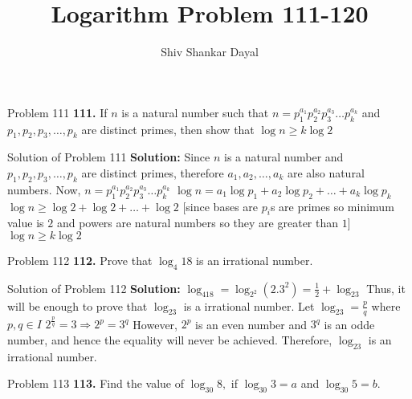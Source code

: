 \documentclass[aspectratio=169,8pt]{beamer}
\title{Logarithm Problem 111-120}
\author[Shiv Shankar Dayal]{Shiv Shankar Dayal}
\begin{document}
\begin{frame}
  \titlepage
\end{frame}
\begin{frame}{Problem 111}
  \textbf{111.} If $n$ is a natural number such that $n = p_1^{a_1}p_2^{a_2}p_3^{a_3}\ldots p_k^{a_k}$ and $p_1, p_2, p_3, \ldots, p_k$ are distinct primes, then show that $\log n\geq k\log 2$
\end{frame}
\begin{frame}{Solution of Problem 111}
  \textbf{Solution:} Since $n$ is a natural number and $p_1, p_2, p_3, \ldots, p_k$ are distinct primes, therefore $a_1, a_2, \ldots, a_k$ are also natural numbers.
  \linebreak\linebreak
  Now, $n = p_1^{a_1}p_2^{a_2}p_3^{a_3}\ldots p_k^{a_k}$
  \linebreak\linebreak
  $\log n = a_1\log p_1 + a_2\log p_2 + \ldots + a_k\log p_k$
  $\log n \geq \log 2 + \log 2 + \ldots + \log 2$ [since bases are $p_i$s are primes so minimum value is $2$ and powers are natural numbers so they are greater than $1$]
  \linebreak\linebreak
  $\log n\geq k\log 2$
\end{frame}
\begin{frame}{Problem 112}
  \textbf{112.} Prove that $\log_4 18$ is an irrational number.
\end{frame}
\begin{frame}{Solution of Problem 112}
  \textbf{Solution:} $\log_418 = \log_{2^2}(2.3^2) = \frac{1}{2} + \log_23$
  \linebreak\linebreak
  Thus, it will be enough to prove that $\log_23$ is a irrational number.
  \linebreak\linebreak
  Let $\log_23 = \frac{p}{q}$ where $p, q\in I$
  \linebreak\linebreak
  $2^{\frac{p}{q}} = 3 \Rightarrow 2^p = 3^q$
  \linebreak\linebreak
  However, $2^p$ is an even number and $3^q$ is an odde number, and hence the equality will never be achieved. Therefore, $\log_23$ is an irrational number.
\end{frame}
\begin{frame}{Problem 113}
  \textbf{113.} Find the value of $\log_{30}8,$ if $\log_{30}3 = a$ and $\log_{30}5 = b.$
\end{frame}
\end{document}
